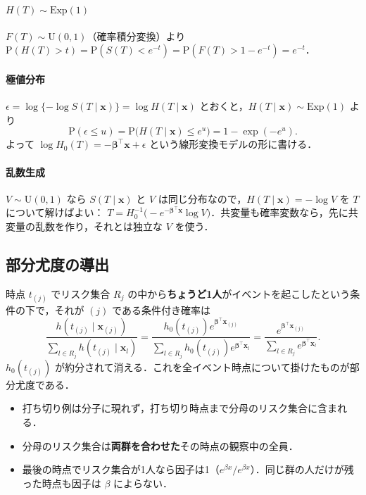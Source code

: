 \documentclass[a4paper,11pt,openany]{ltjsbook}
\newcommand{\Prob}{\mathrm{P}}
\newcommand{\Ex}{\mathrm{Exp}}
\newcommand{\Unif}{\mathrm{U}}
\newcommand{\transp}{^{\top}}
\begin{document}
\paragraph{$H(T)\sim\Ex(1)$}
$F(T)\sim\Unif(0,1)$（確率積分変換）より $\Prob(H(T)>t)=\Prob(S(T)<e^{-t})=\Prob(F(T)>1-e^{-t})=e^{-t}$．
\paragraph{極値分布}
$\epsilon=\log\{-\log S(T\mid\bm x)\}=\log H(T\mid\bm x)$ とおくと，$H(T\mid\bm x)\sim\Ex(1)$ より
\[
\Prob(\epsilon\le u)=\Prob\bigl(H(T\mid\bm x)\le e^u\bigr)=1-\exp(-e^u).
\]
よって $\log H_0(T)=-\bm\beta\transp\bm x+\epsilon$ という線形変換モデルの形に書ける．
\paragraph{乱数生成}
$V\sim\Unif(0,1)$ なら $S(T\mid\bm x)$ と $V$ は同じ分布なので，$H(T\mid\bm x)=-\log V$ を $T$ について解けばよい：
$T=H_0^{-1}\bigl(-e^{-\bm\beta\transp\bm x}\log V\bigr)$．共変量も確率変数なら，先に共変量の乱数を作り，それとは独立な $V$ を使う．

\subsection{部分尤度の導出}
時点 $t_{(j)}$ でリスク集合 $R_j$ の中から\textbf{ちょうど1人}がイベントを起こしたという条件の下で，それが $(j)$ である条件付き確率は
\[
\frac{h(t_{(j)}\mid\bm x_{(j)})}{\sum_{l\in R_j}h(t_{(j)}\mid\bm x_l)}
=\frac{h_0(t_{(j)})e^{\bm\beta\transp\bm x_{(j)}}}{\sum_{l\in R_j}h_0(t_{(j)})e^{\bm\beta\transp\bm x_l}}
=\frac{e^{\bm\beta\transp\bm x_{(j)}}}{\sum_{l\in R_j}e^{\bm\beta\transp\bm x_l}} .
\]
$h_0(t_{(j)})$ が約分されて消える．これを全イベント時点について掛けたものが部分尤度である．
\begin{itemize}
\item 打ち切り例は分子に現れず，打ち切り時点まで分母のリスク集合に含まれる．
\item 分母のリスク集合は\textbf{両群を合わせた}その時点の観察中の全員．
\item 最後の時点でリスク集合が1人なら因子は1（$e^{\beta x}/e^{\beta x}$）．同じ群の人だけが残った時点も因子は $\beta$ によらない．
\end{itemize}
\end{document}
